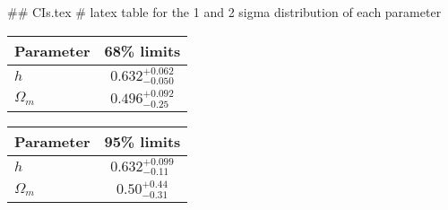 ## CIs.tex
# latex table for the 1 and 2 sigma distribution of each parameter

\begin{tabular} { l  c}
 Parameter &  68\% limits\\
\hline
{\boldmath$h              $} & $0.632^{+0.062}_{-0.050}   $\\
{\boldmath$\Omega_m       $} & $0.496^{+0.092}_{-0.25}    $\\
\hline
\end{tabular}

\begin{tabular} { l  c}
 Parameter &  95\% limits\\
\hline
{\boldmath$h              $} & $0.632^{+0.099}_{-0.11}    $\\
{\boldmath$\Omega_m       $} & $0.50^{+0.44}_{-0.31}      $\\
\hline
\end{tabular}
